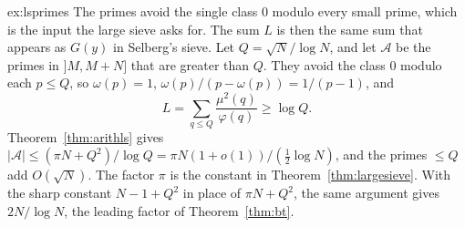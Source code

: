 \begin{solution}{ex:lsprimes}
\idea The primes avoid the single class $0$ modulo every small prime, which is the input the large sieve asks for. The sum $L$ is then the same sum that appears as $G(y)$ in Selberg's sieve.
\writeup Let $Q=\sqrt N/\log N$, and let $\mathcal A$ be the primes in $]M,M+N]$ that are greater than $Q$. They avoid the class $0$ modulo each $p\le Q$, so $\omega(p)=1$, $\omega(p)/(p-\omega(p))=1/(p-1)$, and
\[
L=\sum_{q\le Q}\frac{\mu^2(q)}{\varphi(q)}\ge\log Q.
\]
Theorem~\ref{thm:arithls} gives $|\mathcal A|\le(\pi N+Q^2)/\log Q=\pi N(1+o(1))/(\frac12\log N)$, and the primes $\le Q$ add $O(\sqrt N)$. The factor $\pi$ is the constant in Theorem~\ref{thm:largesieve}. With the sharp constant $N-1+Q^2$ in place of $\pi N+Q^2$, the same argument gives $2N/\log N$, the leading factor of Theorem~\ref{thm:bt}.
\end{solution}

